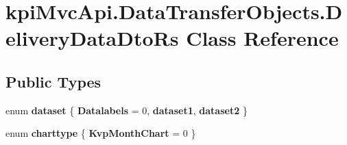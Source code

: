 \hypertarget{classkpi_mvc_api_1_1_data_transfer_objects_1_1_delivery_data_dto_rs}{}\section{kpi\+Mvc\+Api.\+Data\+Transfer\+Objects.\+Delivery\+Data\+Dto\+Rs Class Reference}
\label{classkpi_mvc_api_1_1_data_transfer_objects_1_1_delivery_data_dto_rs}
\subsection*{Public Types}
\begin{DoxyCompactItemize}
\item 
\mbox{\label{classkpi_mvc_api_1_1_data_transfer_objects_1_1_delivery_data_dto_rs_aae6559e3841d130771a24d8345f9a97c}} 
enum {\bfseries dataset} \{ {\bfseries Datalabels} = 0, 
{\bfseries dataset1}, 
{\bfseries dataset2}
 \}
\item 
\mbox{\label{classkpi_mvc_api_1_1_data_transfer_objects_1_1_delivery_data_dto_rs_a09a01f7e378bb8d705847ee3b4fd06f0}} 
enum {\bfseries charttype} \{ {\bfseries Kvp\+Month\+Chart} = 0
 \}
\end{DoxyCompactItemize}
